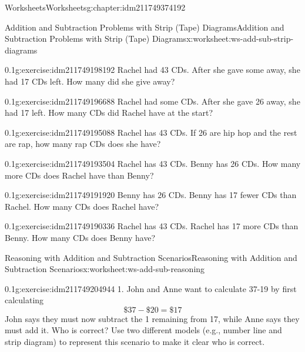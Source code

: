 \documentclass[twoside,11pt,]{book}
\begin{document}
\begin{chapterptx}{Worksheets}{}{Worksheets}{}{}{g:chapter:idm211749374192}
\begin{worksheet-section-numberless}{Addition and Subtraction Problems with Strip (Tape) Diagrams}{}{Addition and Subtraction Problems with Strip (Tape) Diagrams}{}{}{x:worksheet:ws-add-sub-strip-diagrams}
\begin{divisionexercise}{2}{}{0.1}{g:exercise:idm211749198192}
Rachel had 43 CDs.  After she gave some away, she had 17 CDs left.  How many did she give away?%
\end{divisionexercise}%
\begin{divisionexercise}{3}{}{0.1}{g:exercise:idm211749196688}%
Rachel had some CDs.  After she gave 26 away, she had 17 left.  How many CDs did Rachel have at the start?%
\end{divisionexercise}%
\begin{divisionexercise}{4}{}{0.1}{g:exercise:idm211749195088}%
Rachel has 43 CDs.  If 26 are hip hop and the rest are rap, how many rap CDs does she have?%
\end{divisionexercise}%
\begin{divisionexercise}{5}{}{0.1}{g:exercise:idm211749193504}%
Rachel has 43 CDs.  Benny has 26 CDs.  How many more CDs does Rachel have than Benny?%
\end{divisionexercise}%
\begin{divisionexercise}{6}{}{0.1}{g:exercise:idm211749191920}%
Benny has 26 CDs. Benny has 17 fewer CDs than Rachel.  How many CDs does Rachel have?%
\end{divisionexercise}%
\begin{divisionexercise}{7}{}{0.1}{g:exercise:idm211749190336}%
Rachel has 43 CDs. Rachel has 17 more CDs than Benny.  How many CDs does Benny have?%
\end{divisionexercise}%
\end{worksheet-section-numberless}
\restoregeometry
%
%
\typeout{************************************************}
\typeout{************************************************}
%
\begin{worksheet-section-numberless}{Reasoning with Addition and Subtraction Scenarios}{}{Reasoning with Addition and Subtraction Scenarios}{}{}{x:worksheet:ws-add-sub-reasoning}
\begin{divisionexercise}{1}{}{0.1}{g:exercise:idm211749204944}%
1.	John and Anne want to calculate \textdollar{}37-\textdollar{}19 by first calculating%
\begin{equation*}
\$37-\$20=\$17 
\end{equation*}
John says they must now subtract the \textdollar{}1 remaining from \textdollar{}17, while Anne says they must add it.  Who is correct?  Use two different models (e.g., number line and strip diagram) to represent this scenario to make it clear who is correct.%

\end{divisionexercise}
\end{worksheet-section-numberless}
\end{chapterptx}
\end{document}
